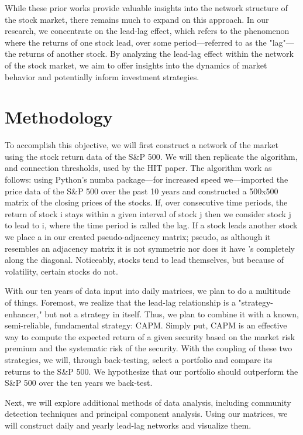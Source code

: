\documentclass{article}
\begin{document}
While these prior works provide valuable insights into the network structure of the stock market, there remains much to expand on this approach. In our research, we concentrate on the lead-lag effect, which refers to the phenomenon where the returns of one stock lead, over some period—referred to as the "lag"—the returns of another stock. By analyzing the lead-lag effect within the network of the stock market, we aim to offer insights into the dynamics of  market behavior and potentially inform investment strategies.
\section{Methodology}
To accomplish this objective, we will first construct a network of the market using the stock return data of the S\&P 500.  We will then replicate the algorithm, and connection thresholds, used by the HIT paper. The algorithm work as follows: using Python's {\selectfont
numba} package—for increased speed we—imported the price data of the S\&P 500 over the past 10 years and constructed a 500x500 matrix of the closing prices of the stocks. If, over consecutive time periods, the return of stock {\selectfont
i} stays within a given interval of stock {\selectfont
j} then we consider stock {\selectfont
j} to lead to {\selectfont
i}, where the time period is called the lag. If a stock leads another stock we place a {} in our created pseudo-adjacency matrix; pseudo, as although it resembles an adjacency matrix it is not symmetric nor does it have {}'s completely along the diagonal. Noticeably, stocks tend to lead themselves, but because of volatility, certain stocks do not. 

With our ten years of data input into daily matrices, we plan to do a multitude of things.  Foremost, we realize that the lead-lag relationship is a "strategy-enhancer," but not a strategy in itself. Thus, we plan to combine it with a known, semi-reliable, fundamental strategy: CAPM. Simply put, CAPM is an effective way to compute the expected return of a given security based on the market risk premium and the systematic risk of the security. With the coupling of these two strategies, we will, through back-testing, select a portfolio and compare its returns to the S\&P 500. We hypothesize that our portfolio should outperform the S\&P 500 over the ten years we back-test.

Next, we will explore additional methods of data analysis, including community detection techniques and principal component analysis. Using our matrices, we will construct daily and yearly lead-lag networks and visualize them.
\end{document}
